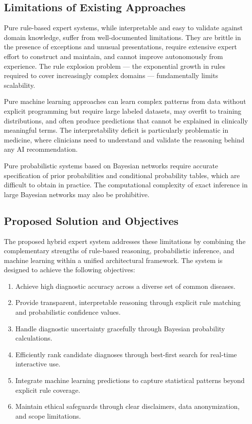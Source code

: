 \documentclass[12pt,a4paper]{article}
\begin{document}
\subsection{Limitations of Existing Approaches}

Pure rule-based expert systems, while interpretable and easy to validate against domain knowledge, suffer from well-documented limitations. They are brittle in the presence of exceptions and unusual presentations, require extensive expert effort to construct and maintain, and cannot improve autonomously from experience. The rule explosion problem --- the exponential growth in rules required to cover increasingly complex domains --- fundamentally limits scalability.

Pure machine learning approaches can learn complex patterns from data without explicit programming but require large labeled datasets, may overfit to training distributions, and often produce predictions that cannot be explained in clinically meaningful terms. The interpretability deficit is particularly problematic in medicine, where clinicians need to understand and validate the reasoning behind any AI recommendation.

Pure probabilistic systems based on Bayesian networks require accurate specification of prior probabilities and conditional probability tables, which are difficult to obtain in practice. The computational complexity of exact inference in large Bayesian networks may also be prohibitive.

\subsection{Proposed Solution and Objectives}

The proposed hybrid expert system addresses these limitations by combining the complementary strengths of rule-based reasoning, probabilistic inference, and machine learning within a unified architectural framework. The system is designed to achieve the following objectives:

\begin{enumerate}[leftmargin=1.5cm]
    \item Achieve high diagnostic accuracy across a diverse set of common diseases.
    \item Provide transparent, interpretable reasoning through explicit rule matching and probabilistic confidence values.
    \item Handle diagnostic uncertainty gracefully through Bayesian probability calculations.
    \item Efficiently rank candidate diagnoses through best-first search for real-time interactive use.
    \item Integrate machine learning predictions to capture statistical patterns beyond explicit rule coverage.
    \item Maintain ethical safeguards through clear disclaimers, data anonymization, and scope limitations.
\end{enumerate}
\end{document}
